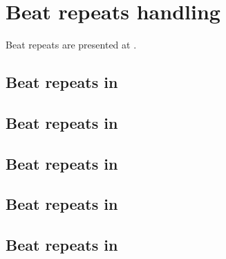 



\chapter{Beat repeats handling}\label{Beat repeats handling}

Beat repeats are presented at .


\section{Beat repeats in \mxsrToMsr{}}


\section{Beat repeats in \mxsrToMsr{}}


\section{Beat repeats in \msrToMsr{}}


\section{Beat repeats in \msrToLpsr{}}


\section{Beat repeats in \lpsrToLilypond{}}


